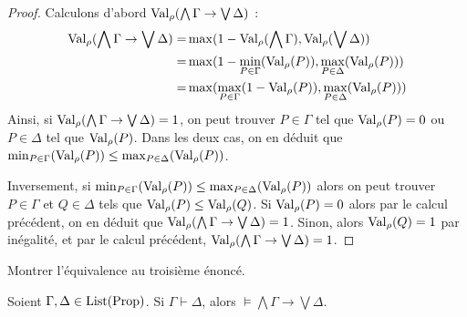 \begin{proof}
  Calculons d'abord $\operatorname{Val}_\rho(\bigwedge\Gamma\to\bigvee\Delta)$ :
  \begin{align*}
    \operatorname{Val}_\rho(\bigwedge\Gamma\to\bigvee\Delta) =&
    \max(1 - \operatorname{Val}_\rho(\bigwedge\Gamma), \operatorname{Val}_\rho(\bigvee\Delta))\\
    =& \max(1 - \min_{P\in \Gamma}(\operatorname{Val}_\rho(P)),\max_{P\in\Delta}(\operatorname{Val}_\rho(P)))\\
    =& \max(\max_{P\in\Gamma}(1 - \operatorname{Val}_\rho(P)),\max_{P\in\Delta}(\operatorname{Val}_\rho(P)))
  \end{align*}
  Ainsi, si $\operatorname{Val}_\rho(\bigwedge\Gamma\to\bigvee\Delta) = 1$, on peut trouver
  $P\in\Gamma$ tel que $\operatorname{Val}_\rho(P) = 0$ ou $P\in\Delta$ tel que $\operatorname{Val}_\rho(P)$.
  Dans les deux cas, on en déduit que
  $\min_{P\in\Gamma}(\operatorname{Val}_\rho(P)) \leq \max_{P\in\Delta}(\operatorname{Val}_\rho(P))$.

  Inversement, si $\min_{P\in\Gamma}(\operatorname{Val}_\rho(P))\leq\max_{P\in\Delta}(\operatorname{Val}_\rho(P))$
  alors on peut trouver $P\in\Gamma$ et $Q\in\Delta$ tels que
  $\operatorname{Val}_\rho(P)\leq\operatorname{Val}_\rho(Q)$. Si $\operatorname{Val}_\rho(P) = 0$ alors par le calcul
  précédent, on en déduit que $\operatorname{Val}_\rho(\bigwedge\Gamma\to\bigvee\Delta) = 1$.
  Sinon, alors $\operatorname{Val}_\rho(Q) = 1$ par inégalité, et par le calcul précédent,
  $\operatorname{Val}_\rho(\bigwedge\Gamma\to\bigvee\Delta) = 1$.
\end{proof}

\begin{exercise}
  Montrer l'équivalence au troisième énoncé.
\end{exercise}

\begin{theorem}
  Soient $\Gamma,\Delta\in\operatorname{List}(\operatorname{Prop})$. Si $\Gamma\vdash\Delta$, alors
  $\models \bigwedge \Gamma\to \bigvee \Delta$.
\end{theorem}

